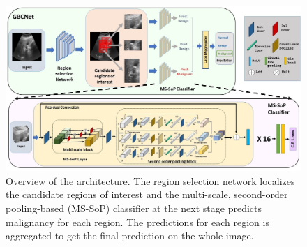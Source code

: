 \begin{figure}[t]
	\centering
	\includegraphics[width=\textwidth]{figs/gbcnet/arch-compact.jpg}
	\caption[Architecture of GBCNet]{Overview of the \gbcnet architecture. The region selection network localizes the candidate regions of interest and the multi-scale, second-order pooling-based (MS-SoP) classifier at the next stage predicts malignancy for each region. The predictions for each region is aggregated to get the final prediction on the whole image.}
	\label{fig-arch-overview}
\end{figure}




%







%
